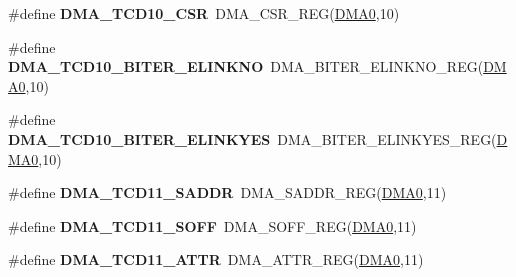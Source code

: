 \begin{DoxyCompactItemize}
\item 
\#define {\bfseries D\+M\+A\+\_\+\+T\+C\+D10\+\_\+\+C\+SR}~D\+M\+A\+\_\+\+C\+S\+R\+\_\+\+R\+EG(\hyperlink{group__DMA__Peripheral__Access__Layer_ga4103044f9ca209772f513dc694513ffb}{D\+M\+A0},10)\hypertarget{group__DMA__Register__Accessor__Macros_ga105f12de22dcf7bd42da746bf250ed09}{}\label{group__DMA__Register__Accessor__Macros_ga105f12de22dcf7bd42da746bf250ed09}

\item 
\#define {\bfseries D\+M\+A\+\_\+\+T\+C\+D10\+\_\+\+B\+I\+T\+E\+R\+\_\+\+E\+L\+I\+N\+K\+NO}~D\+M\+A\+\_\+\+B\+I\+T\+E\+R\+\_\+\+E\+L\+I\+N\+K\+N\+O\+\_\+\+R\+EG(\hyperlink{group__DMA__Peripheral__Access__Layer_ga4103044f9ca209772f513dc694513ffb}{D\+M\+A0},10)\hypertarget{group__DMA__Register__Accessor__Macros_ga72c8aa9c1103e0a6d92468dcb8cd26f7}{}\label{group__DMA__Register__Accessor__Macros_ga72c8aa9c1103e0a6d92468dcb8cd26f7}

\item 
\#define {\bfseries D\+M\+A\+\_\+\+T\+C\+D10\+\_\+\+B\+I\+T\+E\+R\+\_\+\+E\+L\+I\+N\+K\+Y\+ES}~D\+M\+A\+\_\+\+B\+I\+T\+E\+R\+\_\+\+E\+L\+I\+N\+K\+Y\+E\+S\+\_\+\+R\+EG(\hyperlink{group__DMA__Peripheral__Access__Layer_ga4103044f9ca209772f513dc694513ffb}{D\+M\+A0},10)\hypertarget{group__DMA__Register__Accessor__Macros_ga79afca17304b865c762c118811ecf7be}{}\label{group__DMA__Register__Accessor__Macros_ga79afca17304b865c762c118811ecf7be}

\item 
\#define {\bfseries D\+M\+A\+\_\+\+T\+C\+D11\+\_\+\+S\+A\+D\+DR}~D\+M\+A\+\_\+\+S\+A\+D\+D\+R\+\_\+\+R\+EG(\hyperlink{group__DMA__Peripheral__Access__Layer_ga4103044f9ca209772f513dc694513ffb}{D\+M\+A0},11)\hypertarget{group__DMA__Register__Accessor__Macros_gafdcf60dc4fafbaba4ef0aa8078c16b83}{}\label{group__DMA__Register__Accessor__Macros_gafdcf60dc4fafbaba4ef0aa8078c16b83}

\item 
\#define {\bfseries D\+M\+A\+\_\+\+T\+C\+D11\+\_\+\+S\+O\+FF}~D\+M\+A\+\_\+\+S\+O\+F\+F\+\_\+\+R\+EG(\hyperlink{group__DMA__Peripheral__Access__Layer_ga4103044f9ca209772f513dc694513ffb}{D\+M\+A0},11)\hypertarget{group__DMA__Register__Accessor__Macros_ga75ede423859738cb80ae588f482043bb}{}\label{group__DMA__Register__Accessor__Macros_ga75ede423859738cb80ae588f482043bb}

\item 
\#define {\bfseries D\+M\+A\+\_\+\+T\+C\+D11\+\_\+\+A\+T\+TR}~D\+M\+A\+\_\+\+A\+T\+T\+R\+\_\+\+R\+EG(\hyperlink{group__DMA__Peripheral__Access__Layer_ga4103044f9ca209772f513dc694513ffb}{D\+M\+A0},11)\hypertarget{group__DMA__Register__Accessor__Macros_ga4350d724768dbdc84d993c564d3e0c4d}{}\label{group__DMA__Register__Accessor__Macros_ga4350d724768dbdc84d993c564d3e0c4d}


\end{DoxyCompactItemize}
